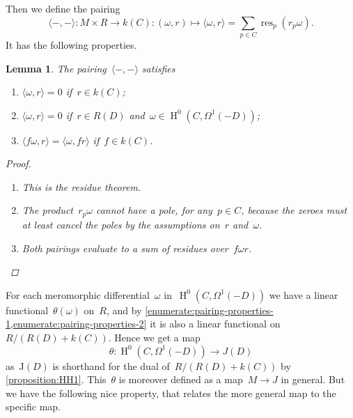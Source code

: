 \documentclass[10pt,a4paper]{article}
\theoremstyle{lecture}
\newtheorem{lemma}[theorem]{Lemma}
\DeclareMathOperator\HH{H}
\DeclareMathOperator\res{res}
\begin{document}
Then we define the pairing
\begin{equation}
  \langle-,-\rangle\colon M\times R\to k(C):(\omega,r)\mapsto\langle\omega,r\rangle=\sum_{p\in C}\res_p(r_p\omega).
\end{equation}
It has the following properties.
\begin{lemma}
  \label{lemma:pairing-properties}
  The pairing~$\langle-,-\rangle$ satisfies
  \begin{enumerate}
    \item\label{enumerate:pairing-properties-1} $\langle\omega,r\rangle=0$ if~$r\in k(C)$;
    \item\label{enumerate:pairing-properties-2} $\langle\omega,r\rangle=0$ if~$r\in R(D)$ and~$\omega\in\HH^0(C,\Omega^1(-D))$;
    \item\label{enumerate:pairing-properties-3} $\langle f\omega,r\rangle=\langle\omega,fr\rangle$ if~$f\in k(C)$.
  \end{enumerate}

  \begin{proof}
    \begin{enumerate}
      \item This is the residue theorem.
      \item The product~$r_p\omega$ cannot have a pole, for any~$p\in C$, because the zeroes must at least cancel the poles by the assumptions on~$r$ and~$\omega$.
      \item Both pairings evaluate to a sum of residues over~$f\omega r$.
    \end{enumerate}
  \end{proof}
\end{lemma}
For each meromorphic differential~$\omega$ in~$\HH^0(C,\Omega^1(-D))$ we have a linear functional~$\theta(\omega)$ on~$R$, and by \cref{enumerate:pairing-properties-1,enumerate:pairing-properties-2} it is also a linear functional on~$R/(R(D)+k(C))$. Hence we get a map
\begin{equation}
  \theta\colon\HH^0(C,\Omega^1(-D))\to J(D)
\end{equation}
as~$\mathrm{J}(D)$ is shorthand for the dual of~$R/(R(D)+k(C))$ by \cref{proposition:HH1}. This~$\theta$ is moreover defined as a map~$M\to J$ in general. But we have the following nice property, that relates the more general map to the specific map.
\end{document}
